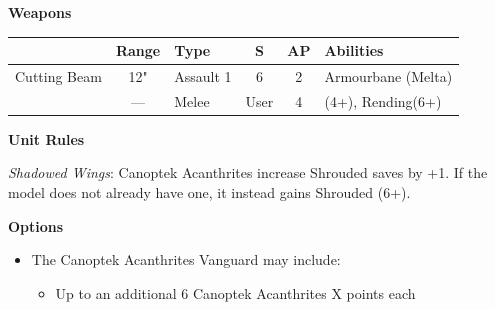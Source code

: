 \begin{minipage}[t]{0.72\textwidth}
	\vspace*{2em}
	\textbf{Weapons}
	
	\begin{tabular}{L{90 pt} c C{40pt} *{2}{c} >{\raggedright\arraybackslash}p{130pt}}
		& Range & Type & S & AP & Abilities \\
		\hline
		Cutting Beam & 12" & Assault 1 & 6 & 2 & Armourbane (Melta) \\
		 & — & Melee & User & 4 &  (4+), Rending(6+) \\
	\end{tabular}
	
	\vspace*{2em}
	\textbf{Unit Rules}
	
	\textit{Shadowed Wings}: Canoptek Acanthrites increase Shrouded saves by +1. If the model does not already have one, it instead gains Shrouded (6+).
		
	\vspace*{2em}
	\textbf{Options}
	\begin{itemize}
		\item The Canoptek Acanthrites Vanguard may include:
		\begin{itemize}
			\item Up to an additional 6 Canoptek Acanthrites \dotfill X points each
		\end{itemize}
	\end{itemize}
\end{minipage}


\newpage
\subsubsection[Canoptek Scarab Swarms]{}

